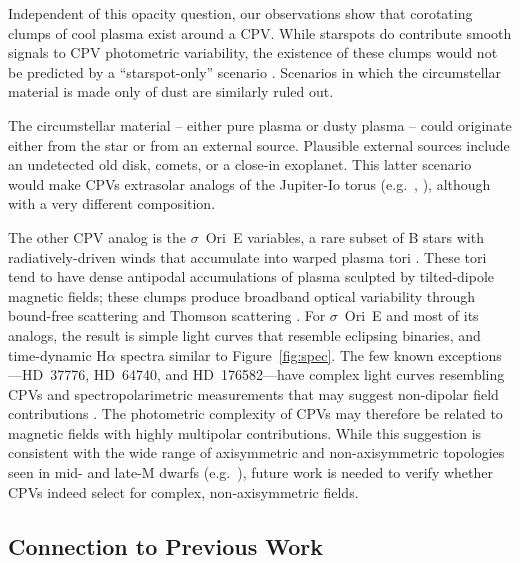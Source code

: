 \documentclass[11pt,twocolumn,tighten]{aastex7}
\begin{document}
Independent of this opacity question, our observations show that
corotating clumps of cool plasma exist around a CPV.  While starspots
do contribute smooth signals to CPV photometric variability, the
existence of these clumps  would not be predicted by a
``starspot-only'' scenario \citep{Koen2021}.  Scenarios in which the
circumstellar material is made only of dust are similarly ruled out.  

The circumstellar material -- either pure plasma or dusty plasma --
could originate either from the star or from an external source.
Plausible external sources include an undetected old disk, comets, or
a close-in exoplanet.  This latter scenario would make CPVs extrasolar
analogs of the Jupiter-Io torus (e.g.~\citealt{Bagenal1981},
\citealt{Kislyakova2018}), although with a very different composition.

The other CPV analog is the $\sigma$~Ori~E variables, a rare subset of
B stars with radiatively-driven winds that accumulate into warped
plasma tori \citep{Townsend2005}.  These tori tend to have dense
antipodal accumulations of plasma sculpted by tilted-dipole magnetic
fields; these clumps produce broadband optical variability through
bound-free scattering \citep{Townsend2005} and Thomson scattering
\citep{Berry2022}.  For $\sigma$~Ori~E and most of its analogs, the
result is simple light curves that resemble eclipsing binaries, and
time-dynamic H$\alpha$ spectra similar to Figure~\ref{fig:spec}. 
The few known exceptions---HD~37776, HD~64740, and HD~176582---have complex
light curves resembling CPVs \citep{Mikulasek2020,Bouma2024} and
spectropolarimetric measurements that may suggest non-dipolar field
contributions \citep{Kochukhov2011,Shultz2018}.  
The photometric complexity of CPVs may therefore be related to
magnetic fields with highly multipolar contributions.  While this
suggestion is consistent with the wide range of axisymmetric and
non-axisymmetric topologies seen in mid- and late-M dwarfs
(e.g.~\citealt{Donati2006,Kochukhov2017,Shulyak2019,Bellotti2024}),
future work is needed to verify whether CPVs indeed select for
complex, non-axisymmetric fields.


\subsection{Connection to Previous Work}
\end{document}

